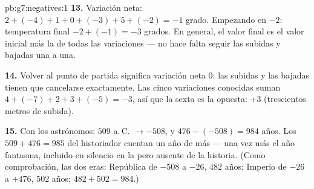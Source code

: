 \begin{solution}{pb:g7:negatives:1}
\textbf{13.} Variación neta:
$2 + (-4) + 1 + 0 + (-3) + 5 + (-2) = -1$ grado. Empezando en
$-2$: temperatura final $-2 + (-1) = -3$ grados. En general,
el valor final es el valor inicial más la  de todas las
variaciones --- no hace falta seguir las subidas y bajadas una a una.

\textbf{14.} Volver al punto de partida significa variación neta $0$: las subidas y
las bajadas tienen que cancelarse exactamente. Las cinco variaciones conocidas suman
$4 + (-7) + 2 + 3 + (-5) = -3$, así que la sexta es la
opuesta: $+3$ (trescientos metros de subida).

\textbf{15.} Con los astrónomos: $509$ a.\,C. $\to -508$, y
$476 - (-508) = 984$ años. Los $509 + 476 = 985$ del historiador
cuentan un año de más --- una vez más el año  fantasma,
incluido en silencio en la  pero ausente de la historia.
(Como comprobación, las dos eras: República de $-508$ a $-26$, $482$
años; Imperio de $-26$ a $+476$, $502$ años;
$482 + 502 = 984$.)
\end{solution}
